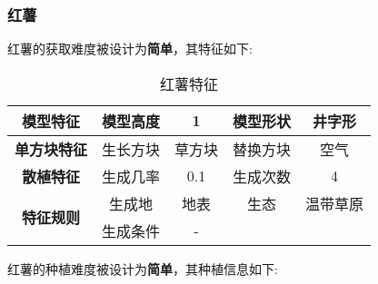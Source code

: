 \subsubsection{红薯}

红薯的获取难度被设计为\textbf{简单}，其特征如下:
\begin{table}[H]
    \centering
    \caption{红薯特征}
    \label{table:红薯特征}
    \setlength{\tabcolsep}{4mm}
    \begin{tabular}{c|cc|cc}
        \toprule
        \textbf{模型特征}                  & 模型高度 & 1      & 模型形状 & 井字形 \\
        \midrule
        \textbf{单方块特征}                & 生长方块 & 草方块 & 替换方块 & 空气   \\
        \midrule
        \textbf{散植特征}                  & 生成几率 & 0.1    & 生成次数 & 4      \\
        \midrule
        \multirow{2}{*}{\textbf{特征规则}} & 生成地   & 地表   & 生态     & 温带草原   \\
                                           & 生成条件 & -              \\
        \bottomrule
    \end{tabular}
\end{table}


红薯的种植难度被设计为\textbf{简单}，其种植信息如下:


